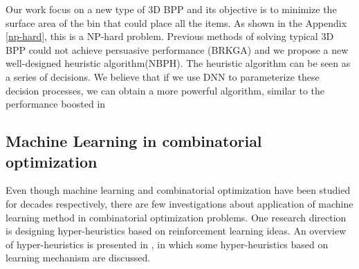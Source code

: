 Our work focus on a new type of 3D BPP and its objective is to minimize the surface area of the bin that could place all the items. As shown in the Appendix \ref{np-hard}, this is a NP-hard problem. Previous methods of solving typical 3D BPP could not achieve persuasive performance (BRKGA) and we propose a new well-designed heuristic algorithm(NBPH). The heuristic algorithm can be seen as a series of decisions. We believe that if we use DNN to parameterize these decision processes, we can obtain a more powerful algorithm, similar to the performance boosted in \cite{Hu2017Solving}


\subsection{Machine Learning in combinatorial optimization}
Even though machine learning and combinatorial optimization have been studied for decades respectively, there are few investigations about application of machine learning method in combinatorial optimization problems. One research direction is designing hyper-heuristics based on reinforcement learning ideas. An overview of hyper-heuristics is presented in \cite{burke2013hyper}, in which some hyper-heuristics based on learning mechanism are discussed. %


